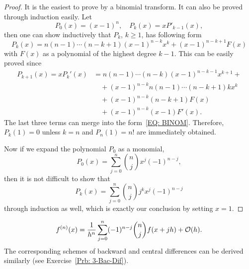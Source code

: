 \begin{proof}
    It is the easiest to prove by a binomial transform. It can also be proved through induction easily. Let 
    $$P_0(x) = (x - 1)^n,\quad P_k(x) =  x P'_{k-1}(x) ,$$
    then one can show inductively that $P_k$, $k\ge 1$, has following form
    \begin{equation}\label{EQ: BINOM}
        P_k(x) = n(n-1)\cdots (n-k+1) (x - 1)^{n-k} x^k  + (x-1)^{n-k+1} F(x)
    \end{equation}
    with $F(x)$ as a polynomial of the highest degree $k-1$. This can be easily proved since 
    \begin{equation}
        \begin{aligned}
           P_{k+1}(x) =  x P_k'(x) &= n(n-1)\cdots (n-k)(x-1)^{n-k-1} x^{k+1} + \\&\quad +   (x-1)^{n-k} { n(n-1)\cdots (n-k+1) k x^k}  \\
           &\quad + (x-1)^{n-k} {(n-k+1)  F(x)}\\
           &\quad+(x-1)^{n-k} {(x-1)F'(x)}.
        \end{aligned}
    \end{equation}
    The last three terms can merge into the form~\eqref{EQ: BINOM}. Therefore, $P_k(1) = 0$ unless $k = n$ and $P_n(1) = n!$ are immediately obtained. 

    Now if we expand the polynomial $P_0$ as a monomial, 
    \begin{equation}
        P_0(x)=\sum_{j=0}^n \binom{n}{j} x^j (-1)^{n-j}, 
    \end{equation}
    then it is not difficult to show that 
    $$P_k(x) = \sum_{j=0}^n \binom{n}{j} j^k x^j (-1)^{n-j}$$
    through induction as well, which is exactly our conclusion by setting $x = 1$.
\end{proof}
\begin{theorem}\label{THM: FORWARD FD}
    $$f^{(n)}(x) = \frac{1}{h^n}\sum_{j=0}^n (-1)^{n-j} \binom{n}{j} f(x + j h) + \mathcal O(h).$$
    The corresponding schemes of backward and central differences can be derived similarly (see Exercise~\ref{Prb: 3-Bac-Dif}).
\end{theorem}
